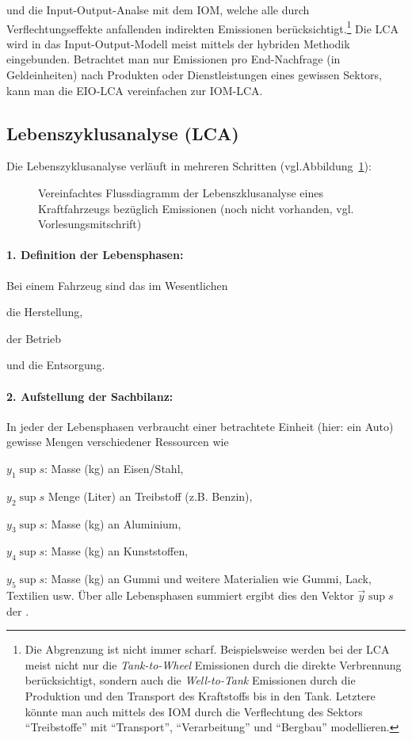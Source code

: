 \item und die Input-Output-Analse mit dem IOM, welche alle durch
  Verflechtungseffekte anfallenden indirekten Emissionen
  ber\"ucksichtigt.\footnote{Die Abgrenzung ist nicht immer
    scharf. Beispielsweise werden bei der LCA meist nicht nur die
    \emph{Tank-to-Wheel} Emissionen durch die direkte Verbrennung
    ber\"ucksichtigt, sondern auch die \emph{Well-to-Tank} Emissionen durch
    die Produktion und den Transport des Kraftstoffs bis in den
    Tank. Letztere k\"onnte man auch mittels des IOM durch die
    Verflechtung des Sektors ``Treibstoffe'' mit ``Transport'',
    ``Verarbeitung'' und ``Bergbau'' modellieren.} Die LCA wird in das
  Input-Output-Modell meist mittels der hybriden Methodik 
 eingebunden.
\ei
Betrachtet man nur Emissionen pro End-Nachfrage (in Geldeinheiten)
nach Produkten oder Dienstleistungen eines gewissen Sektors, kann man
die EIO-LCA vereinfachen zur IOM-LCA.

\subsection{Lebenszyklusanalyse (LCA)}

Die Lebenszyklusanalyse verl\"auft in mehreren Schritten
(vgl.Abbildung~\ref{fig:LCA}):
\begin{figure}
\caption{\label{fig:LCA}Vereinfachtes Flussdiagramm der
  Lebenszklusanalyse 
 eines Kraftfahrzeugs bez\"uglich Emissionen (noch nicht vorhanden,
 vgl. Vorlesungsmitschrift)
} 
\end{figure}

\paragraph{1. Definition der Lebensphasen:}
Bei einem Fahrzeug sind das im Wesentlichen
\bi
\item die Herstellung,
\item der Betrieb
\item und die Entsorgung.
\ei

\paragraph{2. Aufstellung der Sachbilanz:} 
In jeder der Lebensphasen verbraucht einer betrachtete Einheit (hier:
ein Auto) gewisse Mengen verschiedener Ressourcen wie
\bi
\item $y_1\sup{s}$: Masse (kg) an Eisen/Stahl,  
\item $y_2\sup{s}$  Menge (Liter) an Treibstoff (z.B. Benzin),
\item $y_3\sup{s}$: Masse (kg)  an Aluminium,
\item $y_4\sup{s}$: Masse (kg)  an Kunststoffen,
\item $y_5\sup{s}$: Masse (kg)  an Gummi
\ei
und weitere Materialien wie Gummi, Lack, Textilien usw.
\"Uber alle Lebensphasen summiert ergibt dies den
Vektor $\vec{y}\sup{s}$ der .

